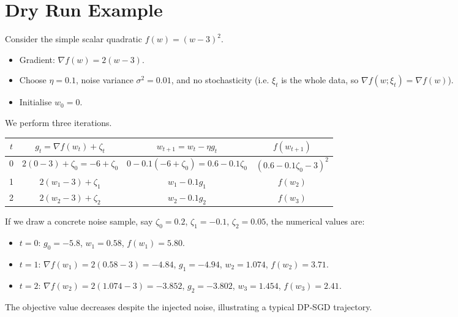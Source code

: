 \documentclass{article}
\newcommand{\grad}{\nabla}
\begin{document}
\section*{Dry Run Example}
Consider the simple scalar quadratic $f(w)=(w-3)^2$.
\begin{itemize}
    \item Gradient: $\grad f(w)=2(w-3)$.
    \item Choose $\eta=0.1$, noise variance $\sigma^{2}=0.01$, and no stochasticity
          (i.e. $\xi_t$ is the whole data, so $\grad f(w;\xi_t)=\grad f(w)$).
    \item Initialise $w_0=0$.
\end{itemize}
We perform three iterations.

\begin{center}
\begin{tabular}{c|c|c|c}
$t$ & $g_t= \grad f(w_t)+\zeta_t$ & $w_{t+1}=w_t-\eta g_t$ & $f(w_{t+1})$\\\hline
0 & $2(0-3)+\zeta_0 = -6+\zeta_0$ & $0-0.1(-6+\zeta_0)=0.6-0.1\zeta_0$ & $(0.6-0.1\zeta_0-3)^2$\\
1 & $2(w_1-3)+\zeta_1$ & $w_1-0.1 g_1$ & $f(w_2)$\\
2 & $2(w_2-3)+\zeta_2$ & $w_2-0.1 g_2$ & $f(w_3)$\\
\end{tabular}
\end{center}
If we draw a concrete noise sample, say $\zeta_0=0.2$, $\zeta_1=-0.1$, $\zeta_2=0.05$,
the numerical values are:

\begin{itemize}
    \item $t=0$: $g_0=-5.8$, $w_1=0.58$, $f(w_1)=5.80$.
    \item $t=1$: $\grad f(w_1)=2(0.58-3)=-4.84$, $g_1=-4.94$, $w_2=1.074$, $f(w_2)=3.71$.
    \item $t=2$: $\grad f(w_2)=2(1.074-3)=-3.852$, $g_2=-3.802$, $w_3=1.454$, $f(w_3)=2.41$.
\end{itemize}
The objective value decreases despite the injected noise, illustrating a typical DP‑SGD trajectory.

\newpage
\end{document}
